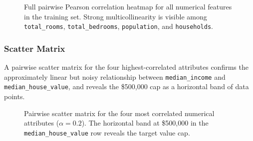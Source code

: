 \documentclass[conference]{IEEEtran}
\begin{document}
\begin{figure}[H]
    \centering
    \caption{Full pairwise Pearson correlation heatmap for all numerical features in the training set. Strong multicollinearity is visible among \texttt{total\_rooms}, \texttt{total\_bedrooms}, \texttt{population}, and \texttt{households}.}
    \label{fig:heatmap}
\end{figure}

\subsubsection{Scatter Matrix}

A pairwise scatter matrix for the four highest-correlated attributes confirms the approximately linear but noisy relationship between \texttt{median\_income} and \texttt{median\_house\_value}, and reveals the \$500,000 cap as a horizontal band of data points.

\begin{figure}[H]
    \centering
    \caption{Pairwise scatter matrix for the four most correlated numerical attributes ($\alpha = 0.2$). The horizontal band at \$500,000 in the \texttt{median\_house\_value} row reveals the target value cap.}
    \label{fig:scatter_matrix}
\end{figure}
\end{document}
